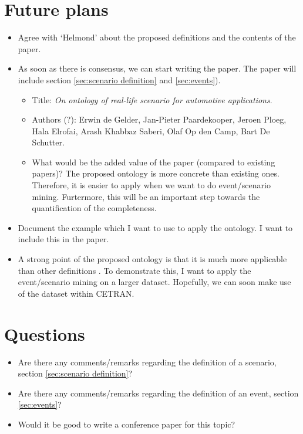 \documentclass[10pt,final,a4paper,oneside,onecolumn]{article}
\begin{document}
\section{Future plans}

\begin{itemize}
	\item Agree with `Helmond' about the proposed definitions and the contents of the paper. 
	\item As soon as there is consensus, we can start writing the paper. The paper will include section \ref{sec:scenario definition} and \ref{sec:events}).
	\begin{itemize}
		\item Title: \emph{On ontology of real-life scenario for automotive applications}.
		\item Authors (?): Erwin de Gelder, Jan-Pieter Paardekooper, Jeroen Ploeg, Hala Elrofai, Arash Khabbaz Saberi, Olaf Op den Camp, Bart De Schutter.
		\item What would be the added value of the paper (compared to existing papers)? The proposed ontology is more concrete than existing ones. Therefore, it is easier to apply when we want to do event/scenario mining. Furtermore, this will be an important step towards the quantification of the completeness.
	\end{itemize}
	\item Document the example which I want to use to apply the ontology. I want to include this in the paper.
	\item A strong point of the proposed ontology is that it is much more applicable than other definitions \cite{geyer2014, ulbrich2015, elrofai2016scenario}. To demonstrate this, I want to apply the event/scenario mining on a larger dataset. Hopefully, we can soon make use of the dataset within CETRAN.
\end{itemize}

\section{Questions}

\begin{itemize}
	\item Are there any comments/remarks regarding the definition of a scenario, section \ref{sec:scenario definition}?
	\item Are there any comments/remarks regarding the definition of an event, section \ref{sec:events}?
	\item Would it be good to write a conference paper for this topic?
\end{itemize}
\end{document}

